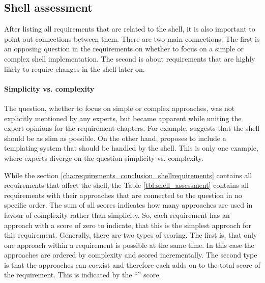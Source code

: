 \subsection{Shell assessment}\label{cha:requirements_conclusion_shell}

After listing all requirements that are related to the shell, it is also important to point out connections between them.
There are two main connections.
The first is an opposing question in the requirements on whether to focus on a simple or complex shell implementation.
The second is about requirements that are highly likely to require changes in the shell later on.



\paragraph{Simplicity vs. complexity}

The question, whether to focus on simple or complex approaches, was not explicitly mentioned by any experts, but became apparent while uniting the expert opinions for the requirement chapters.
For example, \textciteSteyer{} suggests that the shell should be as slim as possible.
On the other hand, \textcite{Grijzen.2019} proposes to include a templating system that should be handled by the shell.
This is only one example, where experts diverge on the question simplicity vs. complexity.

While the section \ref{cha:requirements_conclusion_shellrequirements} contains all requirements that affect the shell, the Table \ref{tbl:shell_assessment} contains all requirements with their approaches that are connected to the question in no specific order.
The sum of all scores indicates how many approaches are used in favour of complexity rather than simplicity.
So, each requirement has an approach with a score of zero to indicate, that this is the simplest approach for this requirement.
Generally, there are two types of scoring.
The first is, that only one approach within a requirement is possible at the same time.
In this case the approaches are ordered by complexity and scored incrementally.
The second type is that the approaches can coexist and therefore each adds on to the total score of the requirement.
This is indicated by the \enquote{} score.

